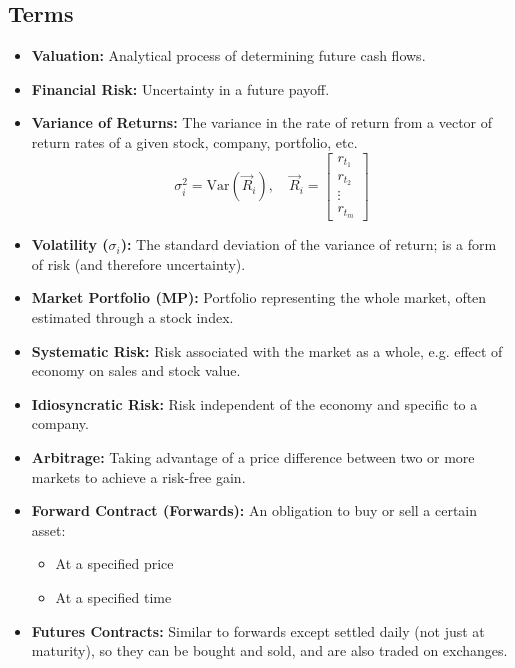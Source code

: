 \subsection{Terms}
\begin{terminology}
    \begin{itemize}
        \item \textbf{Valuation:} Analytical process of determining future cash flows.
        
        \item \textbf{Financial Risk:} Uncertainty in a future payoff.
        
        \item \textbf{Variance of Returns:} The variance in the rate of return from a vector of return rates of a given stock, company, portfolio, etc.
        \[
        \sigma_i^2 = \text{Var}(\vec{R}_i), \quad \vec{R}_i = \begin{bmatrix}
        r_{t_1} \\
        r_{t_2} \\
        \vdots \\
        r_{t_m}
        \end{bmatrix}
        \]
        
        \item \textbf{Volatility ($\sigma_i$):} The standard deviation of the variance of return; is a form of risk (and therefore uncertainty).
        
        \item \textbf{Market Portfolio (MP):} Portfolio representing the whole market, often estimated through a stock index.
        
        \item \textbf{Systematic Risk:} Risk associated with the market as a whole, e.g. effect of economy on sales and stock value.
        
        \item \textbf{Idiosyncratic Risk:} Risk independent of the economy and specific to a company.
        
        \item \textbf{Arbitrage:} Taking advantage of a price difference between two or more markets to achieve a risk-free gain.
        
        \item \textbf{Forward Contract (Forwards):} An obligation to buy or sell a certain asset:
        \begin{itemize}
            \item At a specified price
            \item At a specified time
        \end{itemize}
        
        \item \textbf{Futures Contracts:} Similar to forwards except settled daily (not just at maturity), so they can be bought and sold, and are also traded on exchanges.
    \end{itemize}            
\end{terminology}

